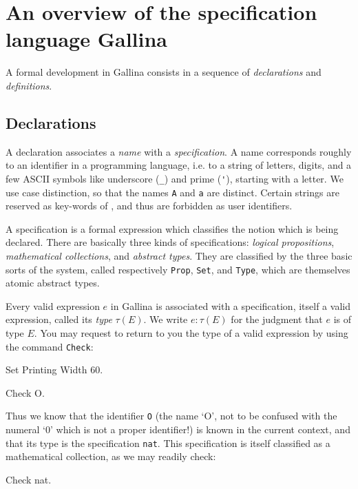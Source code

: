 \documentclass[11pt,a4paper]{book}
\begin{document}
\section{An overview of the specification language Gallina}

A formal development in Gallina consists in a sequence of {\sl declarations}
and {\sl definitions}.

\subsection{Declarations}

A declaration associates a {\sl name} with a {\sl specification}.
A name corresponds roughly to an identifier in a programming
language, i.e. to a string of letters, digits, and a few ASCII symbols like
underscore (\verb"_") and prime (\verb"'"), starting with a letter. 
We use case distinction, so that the names \verb"A" and \verb"a" are distinct.
Certain strings are reserved as key-words of \Coq, and thus are forbidden 
as user identifiers.

A specification is a formal expression which classifies the notion which is
being declared. There are basically three kinds of specifications: 
{\sl logical propositions}, {\sl mathematical collections}, and
{\sl abstract types}. They are classified by the three basic sorts
of the system, called respectively \verb:Prop:, \verb:Set:, and
\verb:Type:, which are themselves atomic abstract types.

Every valid expression $e$ in Gallina is associated with a specification,
itself a valid expression, called its {\sl type} $\tau(E)$. We write
$e:\tau(E)$ for the judgment that $e$ is of type $E$. 
You may request \Coq{} to return to you the type of a valid expression by using
the command \verb:Check::

\begin{coq_eval}
Set Printing Width 60.
\end{coq_eval}

\begin{coq_example}
Check O.
\end{coq_example}

Thus we know that the identifier \verb:O: (the name `O', not to be
confused with the numeral `0' which is not a proper identifier!) is
known in the current context, and that its type is the specification 
\verb:nat:. This specification is itself classified as a mathematical
collection, as we may readily check:

\begin{coq_example}
Check nat.
\end{coq_example}
\end{document}
